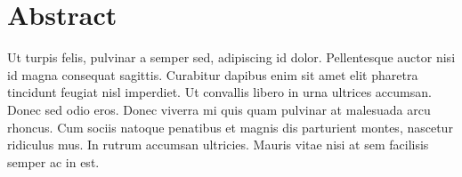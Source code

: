\documentclass[12pt]{article}
\begin{document}
\blankpage

\section*{Abstract}
Ut turpis felis, pulvinar a semper sed, adipiscing id dolor. Pellentesque auctor nisi id magna consequat sagittis. Curabitur dapibus enim sit amet elit pharetra tincidunt feugiat nisl imperdiet. Ut convallis libero in urna ultrices accumsan. Donec sed odio eros. Donec viverra mi quis quam pulvinar at malesuada arcu rhoncus. Cum sociis natoque penatibus et magnis dis parturient montes, nascetur ridiculus mus. In rutrum accumsan ultricies. Mauris vitae nisi at sem facilisis semper ac in est.

\blankpage

\setcounter{tocdepth}{3}
\tableofcontents

\blankpage

\listoffigures

\blankpage

\listoftables

\blankpage

\lstlistoflistings

\blankpage

\setlength{\parskip}{0.2in}







\clearpage


\end{document}
